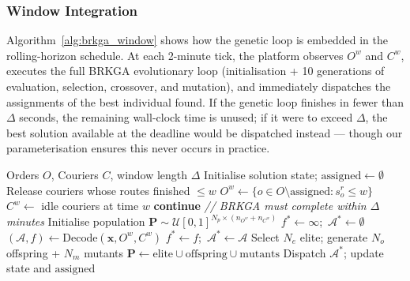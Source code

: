 \subsubsection{Window Integration}\label{subsubsec:integration}

Algorithm~\ref{alg:brkga_window} shows how the genetic loop is
embedded in the rolling-horizon schedule.
At each 2-minute tick, the platform observes $O^w$ and $C^w$,
executes the full BRKGA evolutionary loop
(initialisation + 10 generations of evaluation, selection,
crossover, and mutation), and immediately dispatches the
assignments of the best individual found.
If the genetic loop finishes in fewer than $\Delta$ seconds,
the remaining wall-clock time is unused;
if it were to exceed $\Delta$, the best solution available at
the deadline would be dispatched instead — though our
parameterisation ensures this never occurs in practice.

\begin{algorithm}[ht]
\caption{BRKGA Rolling-Horizon main loop}
\label{alg:brkga_window}
\begin{algorithmic}[1]
\Require Orders $O$, Couriers $C$, window length $\Delta$
\State Initialise solution state; $\text{assigned} \leftarrow \emptyset$
    \State Release couriers whose routes finished $\leq w$
    \State $O^w \leftarrow \{o \in O \setminus \text{assigned} : s^r_o \leq w\}$
    \State $C^w \leftarrow$ idle couriers at time $w$
        \State \textbf{continue}
    \EndIf
    \State \textit{// BRKGA must complete within $\Delta$ minutes}
    \State Initialise population $\mathbf{P} \sim \mathcal{U}[0,1]^{N_p \times (n_{O^w}+n_{C^w})}$
    \State $f^* \leftarrow \infty$;\ $\mathcal{A}^* \leftarrow \emptyset$
     
            \State $(\mathcal{A}, f) \leftarrow \text{Decode}(\mathbf{x}, O^w, C^w)$
             $f^* \leftarrow f$;\ $\mathcal{A}^* \leftarrow \mathcal{A}$ \EndIf
        \EndFor
        \State Select $N_e$ elite; generate $N_o$ offspring + $N_m$ mutants
        \State $\mathbf{P} \leftarrow \text{elite} \cup \text{offspring} \cup \text{mutants}$
    \EndFor
    \State Dispatch $\mathcal{A}^*$; update state and $\text{assigned}$
\EndFor
\end{algorithmic}
\end{algorithm}

